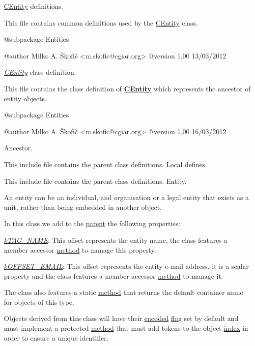\hyperlink{class_c_entity}{C\-Entity} definitions.

This file contains common definitions used by the \hyperlink{class_c_entity}{C\-Entity} class.

\begin{DoxyVerb}    @subpackage     Entities

    @author         Milko A. Škofič <m.skofic@cgiar.org>
    @version        1.00 13/03/2012\end{DoxyVerb}


{\itshape \hyperlink{class_c_entity}{C\-Entity}} class definition.

This file contains the class definition of {\bfseries \hyperlink{class_c_entity}{C\-Entity}} which represents the ancestor of entity objects.

\begin{DoxyVerb}    @subpackage     Entities

    @author         Milko A. Škofič <m.skofic@cgiar.org>
    @version        1.00 16/03/2012\end{DoxyVerb}


Ancestor.

This include file contains the parent class definitions. Local defines.

This include file contains the parent class definitions. Entity.

An entity can be an individual, and organisation or a legal entity that exists as a unit, rather than being embedded in another object.

In this class we add to the \hyperlink{class_c_coded_unit_object}{parent} the following properties\-:


\begin{DoxyItemize}
\item {\itshape \hyperlink{}{k\-T\-A\-G\-\_\-\-N\-A\-M\-E}}\-: This offset represents the entity name, the class features a member accessor \hyperlink{}{method} to manage this property. 
\item {\itshape \hyperlink{}{k\-O\-F\-F\-S\-E\-T\-\_\-\-E\-M\-A\-I\-L}}\-: This offset represents the entity e-\/mail address, it is a scalar property and the class features a member accessor \hyperlink{}{method} to manage it. 
\end{DoxyItemize}

The class also features a static \hyperlink{}{method} that returns the default container name for objects of this type.

Objects derived from this class will have their \hyperlink{}{encoded} \hyperlink{}{flag} set by default and must implement a protected \hyperlink{}{method} that must add tokens to the object \hyperlink{}{index} in order to ensure a unique identifier.

